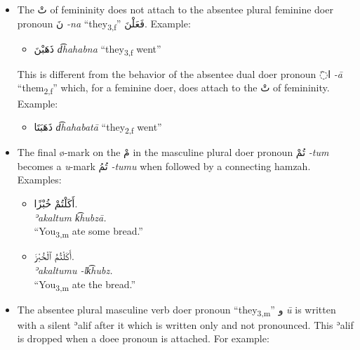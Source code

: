 \documentclass[
  10pt,
]{book}
\providecommand{\tightlist}{%
  \setlength{\itemsep}{0pt}\setlength{\parskip}{0pt}}
\begin{document}
\begin{itemize}
\item
  The \foreignlanguage{arabic}{تْ} of femininity does not attach to the absentee plural feminine doer pronoun \foreignlanguage{arabic}{نَ} \emph{-na} \enquote{they\textsubscript{3,f}} \foreignlanguage{arabic}{فَعَلْنَ}. Example:

  \begin{itemize}
  \tightlist
  \item
    \foreignlanguage{arabic}{ذَهَبْنَ} \emph{d͡hahabna} \enquote{they\textsubscript{3,f} went}
  \end{itemize}

  This is different from the behavior of the absentee dual doer pronoun \foreignlanguage{arabic}{◌َا} \emph{-ā} \enquote{them\textsubscript{2,f}} which, for a feminine doer, does attach to the \foreignlanguage{arabic}{تْ} of femininity. Example:

  \begin{itemize}
  \tightlist
  \item
    \foreignlanguage{arabic}{ذَهَبَتَا} \emph{d͡hahabatā} \enquote{they\textsubscript{2,f} went}
  \end{itemize}
\item
  The final ø-mark on the \foreignlanguage{arabic}{مْ} in the masculine plural doer pronoun \foreignlanguage{arabic}{تُمْ} \emph{-tum} becomes a \emph{u}-mark \foreignlanguage{arabic}{تُمُ} \emph{-tumu} when followed by a connecting hamzah. Examples:

  \begin{itemize}
  \tightlist
  \item
    \foreignlanguage{arabic}{أَکَلْتُمْ خُبْزًا.}\\
    \emph{ʾakaltum k͡hubzā.}\\
    \enquote{You\textsubscript{3,m} ate some bread.}
  \item
    \foreignlanguage{arabic}{أَکَلْتُمُ ٱلْخُبْزَ.}\\
    \emph{ʾakaltumu -lk͡hubz.}\\
    \enquote{You\textsubscript{3,m} ate the bread.}
  \end{itemize}
\item
  The absentee plural masculine verb doer pronoun \enquote{they\textsubscript{3,m}} \foreignlanguage{arabic}{و} \emph{ū} is written with a silent ʾalif after it which is written only and not pronounced. This ʾalif is dropped when a doee pronoun is attached. For example:


\end{itemize}
\end{document}
